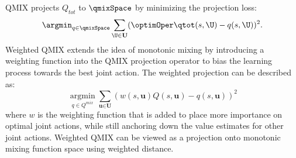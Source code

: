   QMIX projects $Q_{tot}$ to $\qmixSpace$ by minimizing the projection loss:
\begin{equation}
\argmin_{q \in \qmixSpace} \sum_{\U \in \mathbf{U}} (\optimOper \qtot(s,\U) - q 
(s,\U))^2.
\label{eq:qmix_objective}
\end{equation}
Weighted QMIX \cite{WQMIX} extends the idea of monotonic mixing by introducing a weighting function into the QMIX projection operator to bias the learning process towards the best joint action. The weighted projection can be described as:
\begin{equation}
\mathop{\arg\min}\limits_{q \in Q^{mix}} \sum\limits_{\textbf{u}\in \textbf{U}}(w(s, \textbf{u})Q(s, \textbf{u}) - q(s, \textbf{u}))^2
\end{equation}
where $w$ is the weighting function that is added to place more importance on optimal joint actions, while still anchoring down the value estimates for other joint actions.  Weighted QMIX can be viewed as a projection onto monotonic mixing function space using weighted distance.



